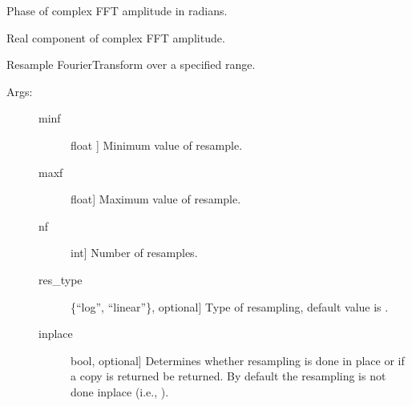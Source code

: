 \documentclass[letterpaper,10pt,english,openany,oneside]{sphinxmanual}
\begin{document}
\begin{fulllineitems}
\begin{fulllineitems}
\end{fulllineitems}


\begin{fulllineitems}
\label{\detokenize{index:sigpropy.FourierTransform.phase}}
Phase of complex FFT amplitude in radians.

\end{fulllineitems}


\begin{fulllineitems}
\label{\detokenize{index:sigpropy.FourierTransform.real}}
Real component of complex FFT amplitude.

\end{fulllineitems}


\begin{fulllineitems}
\label{\detokenize{index:sigpropy.FourierTransform.resample}}
Resample FourierTransform over a specified range.
\begin{description}
\item[{Args:}] \leavevmode\begin{description}
\item[{minf}] \leavevmode{[}float {]}
Minimum value of resample.

\item[{maxf}] \leavevmode{[}float{]}
Maximum value of resample.

\item[{nf}] \leavevmode{[}int{]}
Number of resamples.

\item[{res\_type}] \leavevmode{[}\{“log”, “linear”\}, optional{]}
Type of resampling, default value is .

\item[{inplace}] \leavevmode{[}bool, optional{]}
Determines whether resampling is done in place or 
if a copy is returned be returned. By default the
resampling is not done inplace (i.e., ).


\end{description}
\end{description}
\end{fulllineitems}
\end{fulllineitems}
\end{document}
